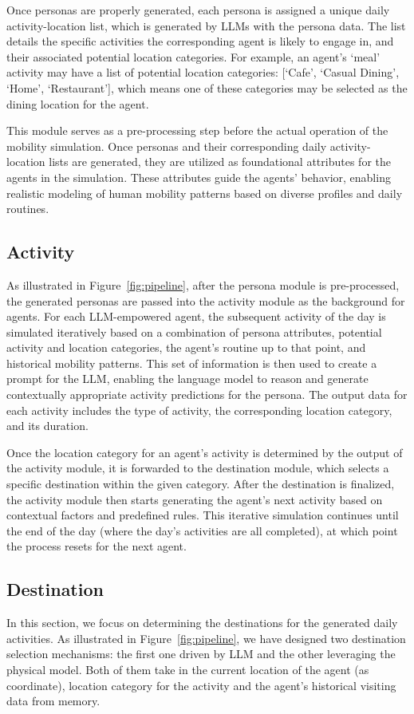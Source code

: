 Once personas are properly generated, each persona is assigned a unique daily activity-location list, which is generated by LLMs with the persona data.
The list details the specific activities the corresponding agent is likely to engage in, and their associated potential location categories. For example, an agent's `meal' activity may have a list of potential location categories: [`Cafe', `Casual Dining', `Home', `Restaurant'], which means one of these categories may be selected as the dining location for the agent.

This module serves as a pre-processing step before the actual operation of the mobility simulation. Once personas and their corresponding daily activity-location lists are generated, they are utilized as foundational attributes for the agents in the simulation. These attributes guide the agents' behavior, enabling realistic modeling of human mobility patterns based on diverse profiles and daily routines.

\subsection{Activity}
As illustrated in Figure~\ref{fig:pipeline}, after the persona module is pre-processed, the generated personas are passed into the activity module as the background for agents. 
For each LLM-empowered agent, the subsequent activity of the day is simulated iteratively based on a combination of persona attributes, potential activity and location categories, the agent's routine up to that point, and historical mobility patterns. This set of information is then used to create a prompt for the LLM, enabling the language model to reason and generate contextually appropriate activity predictions for the persona. The output data for each activity includes the type of activity, the corresponding location category, and its duration.

Once the location category for an agent's activity is determined by the output of the activity module, it is forwarded to the destination module, which selects a specific destination within the given category. After the destination is finalized, the activity module then starts generating the agent's next activity based on contextual factors and predefined rules. This iterative simulation continues until the end of the day (where the day's activities are all completed), at which point the process resets for the next agent.

\subsection{Destination}
In this section, we focus on determining the destinations for the generated daily activities. As illustrated in Figure~\ref{fig:pipeline}, we have designed two destination selection mechanisms: the first one driven by LLM and the other leveraging the physical model. Both of them take in the current location of the agent (as coordinate), location category for the activity and the agent's historical visiting data from memory.

